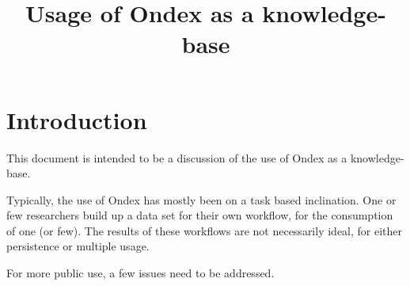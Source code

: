\documentclass[a4paper,10pt]{article}
\title{Usage of Ondex as a knowledge-base}
\newcommand{\nl}{\vskip 0.5cm \noindent}
\begin{document}
\maketitle

\section{Introduction}

This document is intended to be a discussion of the use of Ondex as a knowledge-base.

\nl
Typically, the use of Ondex has mostly been on a task based inclination. One or few researchers build up a data set for their own workflow, for the consumption of one (or few). The results of these workflows are not necessarily ideal, for either persistence or multiple usage.


For more public use, a few issues need to be addressed.
\end{document}
